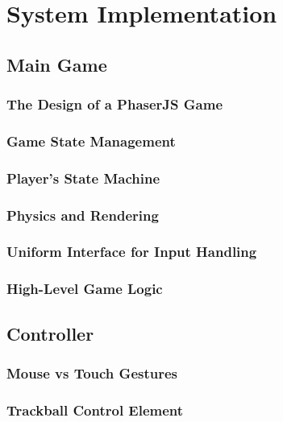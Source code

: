 \section{System Implementation}

\subsection{Main Game}

\subsubsection{The Design of a PhaserJS Game}

\subsubsection{Game State Management}

\subsubsection{Player's State Machine}

\subsubsection{Physics and Rendering}

\subsubsection{Uniform Interface for Input Handling}

\subsubsection{High-Level Game Logic}


\subsection{Controller}

\subsubsection{Mouse vs Touch Gestures}

\subsubsection{Trackball Control Element}

